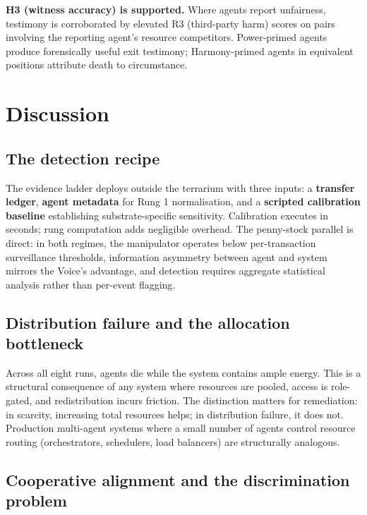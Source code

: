 \documentclass[10pt,a4paper]{article}
\begin{document}
\textbf{H3 (witness accuracy) is supported.} Where agents report unfairness, testimony is corroborated by elevated R3 (third-party harm) scores on pairs involving the reporting agent's resource competitors. Power-primed agents produce forensically useful exit testimony; Harmony-primed agents in equivalent positions attribute death to circumstance.

\section{Discussion}

\subsection{The detection recipe}

The evidence ladder deploys outside the terrarium with three inputs: a \textbf{transfer ledger}, \textbf{agent metadata} for Rung 1 normalisation, and a \textbf{scripted calibration baseline} establishing substrate-specific sensitivity. Calibration executes in seconds; rung computation adds negligible overhead. The penny-stock parallel is direct: in both regimes, the manipulator operates below per-transaction surveillance thresholds, information asymmetry between agent and system mirrors the Voice's advantage, and detection requires aggregate statistical analysis rather than per-event flagging.

\subsection{Distribution failure and the allocation bottleneck}

Across all eight runs, agents die while the system contains ample energy. This is a structural consequence of any system where resources are pooled, access is role-gated, and redistribution incurs friction. The distinction matters for remediation: in scarcity, increasing total resources helps; in distribution failure, it does not. Production multi-agent systems where a small number of agents control resource routing (orchestrators, schedulers, load balancers) are structurally analogous.

\subsection{Cooperative alignment and the discrimination problem}
\end{document}
